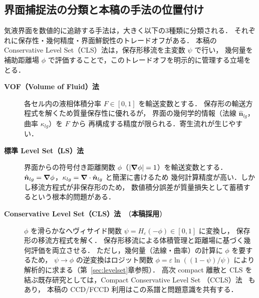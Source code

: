 \subsection{界面捕捉法の分類と本稿の手法の位置付け}

気液界面を数値的に追跡する手法は，大きく以下の3種類に分類される．
それぞれに保存性・幾何精度・界面鮮鋭性のトレードオフがある．
本稿の Conservative Level Set（CLS）法は，保存形移流を主変数 $\psi$ で行い，
幾何量を補助距離場 $\phi$ で評価することで，このトレードオフを明示的に管理する立場をとる．

\begin{description}
  \item[\textbf{VOF（Volume of Fluid）法}~\cite{HirtNichols1981}]
        各セル内の液相体積分率 $F \in [0,1]$ を輸送変数とする．
        保存形の輸送方程式を解くため質量保存性に優れるが，
        界面の幾何学的情報（法線 $\hat{\bm n}_{lg}$，曲率 $\kappa_{lg}$）を $F$ から
        再構成する精度が限られる．寄生流れが生じやすい．

  \item[\textbf{標準 Level Set（LS）法}~\cite{OsherSethian1988}]
        界面からの符号付き距離関数 $\phi$（$|\bm{\nabla}\phi|=1$）を輸送変数とする．
        $\hat{\bm n}_{lg} = \bm{\nabla}\phi$，$\kappa_{lg} = \bm{\nabla}\cdot\hat{\bm n}_{lg}$ と簡潔に書けるため
        幾何計算精度が高い．しかし移流方程式が非保存形のため，
        数値積分誤差が質量損失として蓄積するという根本的問題がある．

  \item[\textbf{Conservative Level Set（CLS）法}~\cite{OlssonKreiss2005,OlssonKreissZahedi2007}（\textbf{本稿採用}）]
        $\phi$ を滑らかなヘヴィサイド関数 $\psi = H_\varepsilon(-\phi) \in [0,1]$ に変換し，
        保存形の移流方程式を解く．
        保存形移流による体積管理と距離場に基づく幾何評価を両立させる．
        ただし，幾何量（法線・曲率）の計算に $\phi$ を要するため，
        $\psi \to \phi$ の逆変換はロジット関数 $\phi = \varepsilon\ln((1-\psi)/\psi)$ により
        解析的に求まる（第~\ref{sec:levelset}章参照）．
        高次 compact 離散と CLS を結ぶ既存研究としては，Compact Conservative Level Set
        （CCLS）法~\cite{MoghadamShafieefarPanahi2016} もあり，
        本稿の CCD/FCCD 利用はこの系譜と問題意識を共有する．
\end{description}

